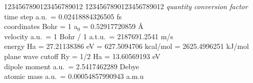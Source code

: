 \documentclass[twoside,10pt,titlepage,a4paper]{article}
\begin{document}
\begin{tabbing}
1234567890123456789012 \= 1234567890123456789012  \kill
\textit{quantity} \> \textit{conversion factor} \\
time step          a.u.\ =  0.02418884326505 fs \\
coordinates        Bohr = 1 a$_0$ = 0.52917720859 {\AA} \\
velocity           a.u.\ = 1 Bohr / 1 a.t.u.\ = 2187691.2541 m/s \\
energy             Ha = 27.21138386 eV = 627.5094706 kcal/mol = 2625.4996251 kJ/mol \\
plane wave cutoff  Ry = 1/2 Ha = 13.60569193 eV \\
dipole moment      a.u.\ = 2.5417462289 Debye\\
atomic mass        a.u.\ = 0.00054857990943 a.m.u\\
\end{tabbing}
\clearpage

\clearpage
\end{document}
